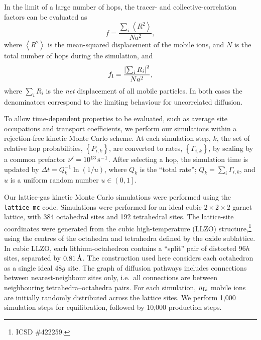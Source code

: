 \documentclass[aps,prb,twocolumn,superscriptaddress,reprint]{revtex4-1}
\newcommand{\set}[1]{\left\{#1\right\}}
\newcommand{\angstrom}{\mbox{\normalfont\AA}}
\begin{document}
In the limit of a large number of hops, the tracer- and collective-correlation factors can be evaluated as
\begin{equation}
  f = \frac{\sum_i\left<R^2\right>}{Na^2},
  \label{eqn:tracer_correlation_factor}
\end{equation}
where $\left<R^2\right>$ is the mean-squared displacement of the mobile ions, and $N$ is the total number of hops during the simulation,\cite{VanDerVenEtAl_PhysRevB2001} and
\begin{equation}
  f_{\mathrm{I}} = \frac{\left|\sum_i R_i\right|^2}{Na^2},
  \label{eqn:collective_correlation_factor}
\end{equation}
where $\sum_i R_i$ is the \emph{net} displacement of all mobile particles. 
In both cases the denominators correspond to the limiting behaviour for uncorrelated diffusion.

To allow time-dependent properties to be evaluated, such as average site occupations and transport coefficients, we perform our simulations within a rejection-free kinetic Monte Carlo scheme.\cite{Voter_RadiationEffectsInSolids2007} 
At each simulation step, $k$, the set of relative hop probabilities, $\set{P_{i,k}}$, are converted to rates, $\set{\Gamma_{i,k}}$, by scaling by a common prefactor $\nu^\prime=10^{13}\,\mathrm{s}^{-1}$. 
After selecting a hop, the simulation time is updated by $\Delta t = Q_k^{-1}\ln\left(1/u\right)$, where $Q_k$ is the ``total rate''; $Q_k=\sum_i \Gamma_{i,k}$, and $u$ is a uniform random number $u\in\left(0,1\right]$. 

Our lattice-gas kinetic Monte Carlo simulations were performed using the \texttt{lattice\_mc} code.\cite{Morgan_JOSS2017} 
Simulations were performed for an ideal cubic $2\times2\times2$ garnet lattice, with 384 octahedral sites and 192 tetrahedral sites. 
The lattice-site coordinates were generated from the cubic high-temperature  (LLZO) structure,\footnote{ICSD \#422259.\cite{AwakaEtAl_ChemLett2011}} using the centres of the octahedra and tetrahedra defined by the oxide sublattice. 
In cubic LLZO, each lithium-octahedron contains a ``split'' pair of distorted $96h$ sites, separated by $0.81\u{\angstrom}$. 
The construction used here considers each octahedron as a single ideal $48g$ site. 
The graph of diffusion pathways includes connections between nearest-neighbour sites only, i.e.\ all connections are between neighbouring tetrahedra--octahedra pairs. For each simulation, $n_{\mathrm{Li}}$ mobile ions are initially randomly distributed across the lattice sites. We perform 1,000 simulation steps for equilibration, followed by 10,000 production steps. 
\end{document}
